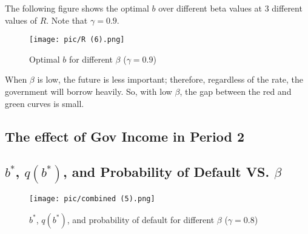 \documentclass{article}
\begin{document}
The following figure shows the optimal $b$ over different beta values at 3 different values of $R$. Note that $\gamma = 0.9$.

\begin{figure}[H]
\centering
{\texttt{[image: pic/R (6).png]}}
\caption{Optimal $b$ for different $\beta$ ($\gamma = 0.9$)}
\end{figure}

When $\beta$ is low, the future is less important; therefore, regardless of the rate, the government will borrow heavily. So, with low $\beta$, the gap between the red and green curves is small.

\subsection{The effect of Gov Income in Period 2}







\newpage

\subsection{$b^*$, $q(b^*)$, and Probability of Default VS. $\beta$}

\begin{figure}[H]
\centering
{\texttt{[image: pic/combined (5).png]}}
\caption{$b^*$, $q(b^*)$, and probability of default for different $\beta$ ($\gamma = 0.8$)}
\end{figure}
\end{document}

